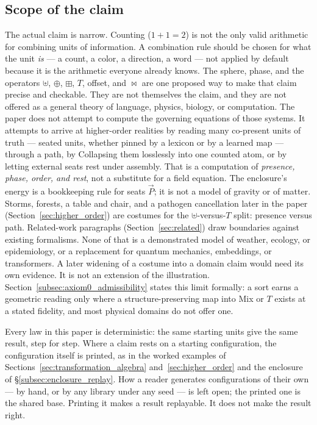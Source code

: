 \documentclass[12pt, a4paper]{article}
\begin{document}
\subsection{Scope of the claim}
\label{subsec:claim_scope}
The actual claim is narrow. Counting ($1+1=2$) is not the only valid
arithmetic for combining units of information. A combination rule
should be chosen for what the unit \emph{is} --- a count, a color, a
direction, a word --- not applied by default because it is the
arithmetic everyone already knows. The sphere, phase, and the
operators $\uplus$, $\oplus$, $\boxplus$, $T$, offset, and $\bowtie$ are one
proposed way to make that claim precise and checkable. They are not
themselves the claim, and they are not offered as a general theory of
language, physics, biology, or computation.
The paper does not attempt to compute the governing equations of
those systems. It attempts to arrive at higher-order realities by
reading many co-present units of truth --- seated units, whether
pinned by a lexicon or by a learned map --- through a path, by
Collapsing them losslessly into one counted atom, or by letting
external seats rest under assembly. That is a computation of
\emph{presence, phase, order, and rest}, not a substitute for a field
equation. The enclosure's energy is a bookkeeping rule for seats
$\vec P$; it is not a model of gravity or of matter.
Storms, forests, a table and chair, and a pathogen cancellation later in the paper
(Section~\ref{sec:higher_order}) are costumes for the
$\uplus$-versus-$T$ split: presence versus path. Related-work
paragraphs (Section~\ref{sec:related}) draw boundaries against
existing formalisms. None of that is a demonstrated model of weather,
ecology, or epidemiology, or a replacement for quantum mechanics,
embeddings, or transformers. A later widening of a costume into a
domain claim would need its own evidence. It is not an extension of
the illustration.
Section~\ref{subsec:axiom0_admissibility} states this limit formally:
a sort earns a geometric reading only where a structure-preserving
map into Mix or $T$ exists at a stated fidelity, and most physical
domains do not offer one.

Every law in this paper is deterministic: the same starting units
give the same result, step for step. Where a claim rests on a
starting configuration, the configuration itself is printed, as in
the worked examples of Sections~\ref{sec:transformation_algebra}
and~\ref{sec:higher_order} and the enclosure of
\S\ref{subsec:enclosure_replay}. How a reader generates
configurations of their own --- by hand, or by any library under any
seed --- is left open; the printed one is the shared base. Printing
it makes a result replayable. It does not make the result right.
\end{document}

